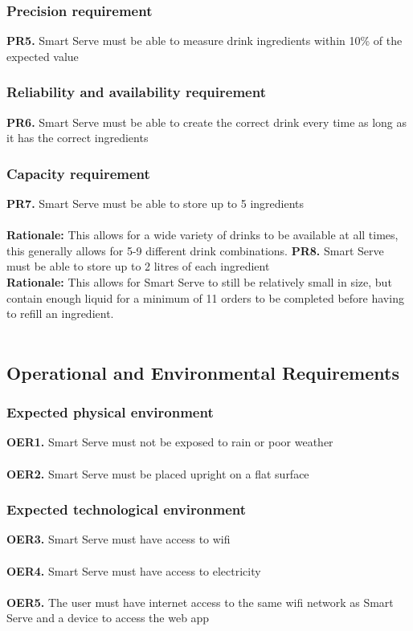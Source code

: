 \documentclass{article}
\begin{document}
    \subsubsection{Precision requirement}
        \noindent\textbf{PR5.} Smart Serve must be able to measure drink ingredients within 10\% of the expected value \\
    \subsubsection{Reliability and availability requirement}
        \noindent\textbf{PR6.} Smart Serve must be able to create the correct drink every time as long as it has the correct ingredients \\
    \subsubsection{Capacity requirement}
        \noindent\textbf{PR7.} Smart Serve must be able to store up to 5 ingredients \\\\
        \textbf{Rationale:} This allows for a wide variety of drinks to be available at all times, this generally allows for 5-9 different drink combinations.
        \textbf{PR8.} Smart Serve must be able to store up to 2 litres of each ingredient \\
        \textbf{Rationale:} This allows for Smart Serve to still be relatively small in size, but contain enough liquid for a minimum of 11 orders to be completed before having to refill an ingredient.\\\\

\subsection{Operational and Environmental Requirements}
    \subsubsection{Expected physical environment}
        \noindent\textbf{OER1.} Smart Serve must not be exposed to rain or poor weather \\\\
        \textbf{OER2.} Smart Serve must be placed upright on a flat surface \\
    \subsubsection{Expected technological environment}
        \noindent\textbf{OER3.} Smart Serve must have access to wifi \\\\
        \textbf{OER4.} Smart Serve must have access to electricity \\\\
        \textbf{OER5.} The user must have internet access to the same wifi network as Smart Serve and a device to access the web app \\
\end{document}
